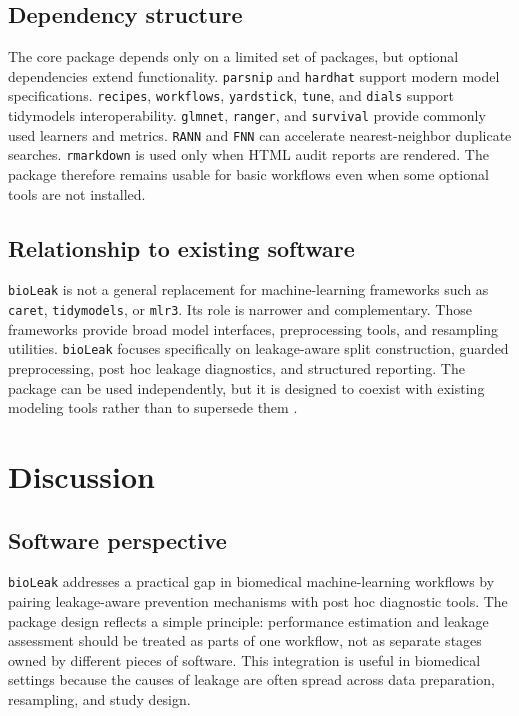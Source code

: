 \documentclass[article]{jss}
\begin{document}
\subsection{Dependency structure}

The core package depends only on a limited set of packages, but optional
dependencies extend functionality. \texttt{parsnip} and \texttt{hardhat} support
modern model specifications. \texttt{recipes}, \texttt{workflows},
\texttt{yardstick}, \texttt{tune}, and \texttt{dials} support tidymodels
interoperability. \texttt{glmnet}, \texttt{ranger}, and \texttt{survival}
provide commonly used learners and metrics. \texttt{RANN} and \texttt{FNN} can
accelerate nearest-neighbor duplicate searches. \texttt{rmarkdown} is used only
when HTML audit reports are rendered. The package therefore remains usable for
basic workflows even when some optional tools are not installed.

\subsection{Relationship to existing software}

\texttt{bioLeak} is not a general replacement for  machine-learning
frameworks such as \texttt{caret}, \texttt{tidymodels}, or \texttt{mlr3}. Its
role is narrower and complementary. Those frameworks provide broad model
interfaces, preprocessing tools, and resampling utilities. \texttt{bioLeak}
focuses specifically on leakage-aware split construction, guarded preprocessing,
post hoc leakage diagnostics, and structured reporting. The package can be used
independently, but it is designed to coexist with existing modeling tools
rather than to supersede them \citep{kuhn2008, kuhn2020, lang2019, bischl2024}.

\section{Discussion}

\subsection{Software perspective}

\texttt{bioLeak} addresses a practical gap in biomedical machine-learning
workflows by pairing leakage-aware prevention mechanisms with post hoc
diagnostic tools. The package design reflects a simple principle: performance
estimation and leakage assessment should be treated as parts of one workflow,
not as separate stages owned by different pieces of software. This integration
is useful in biomedical settings because the causes of leakage are often spread
across data preparation, resampling, and study design.
\end{document}
